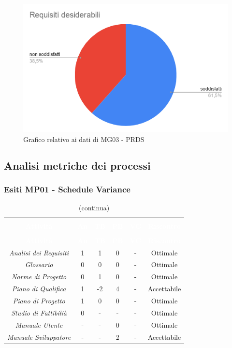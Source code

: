 \begin{figure}[H]
\centering
\includegraphics[scale=0.7]{./img/MG03.png}
\caption{Grafico relativo ai dati di MG03 - PRDS}
\end{figure}

\subsection{Analisi metriche dei processi}
\subsubsection{Esiti MP01 - Schedule Variance} 
\begin{longtable}{c c c c c c}
\rowcolor{white}\caption{Esiti MP01 - Schedule Variance} \\
		\rowcolor{redafk}
\textcolor{white}{\textbf{Attività}} &
\textcolor{white}{\textbf{An}} &
\textcolor{white}{\textbf{TB}} &
\textcolor{white}{\textbf{PB}} &
\textcolor{white}{\textbf{VC}} &
\textcolor{white}{\textbf{Riscontro}} \\
		\endfirsthead
		\rowcolor{white}\caption[]{(continua)} \\
		\rowcolor{redafk}
\textcolor{white}{\textbf{Attività}} &
\textcolor{white}{\textbf{An}} &
\textcolor{white}{\textbf{TB}} &
\textcolor{white}{\textbf{PB}} &
\textcolor{white}{\textbf{VC}} &
\textcolor{white}{\textbf{Riscontro}} \\
		\endhead
\textit{Analisi dei Requisiti} & 
1 &
1 &
0 &
- &
Ottimale \\
\textit{Glossario} & 
0 &
0 &
0 &
- &
Ottimale \\
\textit{Norme di Progetto} & 
0 &
1 &
0 &
- &
Ottimale \\
\textit{Piano di Qualifica} & 
1 &
-2 &
4 &
- &
Accettabile \\
\textit{Piano di Progetto} & 
1 &
0 &
0 &
- &
Ottimale \\
\textit{Studio di Fattibilià} & 
0 &
- &
- &
- &
Ottimale \\
\textit{Manuale Utente} &
- &
- &
0 &
- &
Ottimale \\
\textit{Manuale Sviluppatore} &
- &
- &
2 &
- &
Accettabile \\
\end{longtable}

